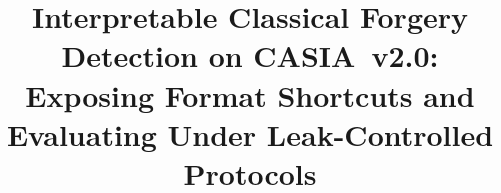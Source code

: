 \documentclass[conference]{IEEEtran}
\begin{document}
\title{Interpretable Classical Forgery Detection on CASIA~v2.0:\\
Exposing Format Shortcuts and Evaluating Under Leak-Controlled Protocols}

\author{
}

\maketitle
















\balance



\clearpage
\onecolumn
\appendices

\end{document}
